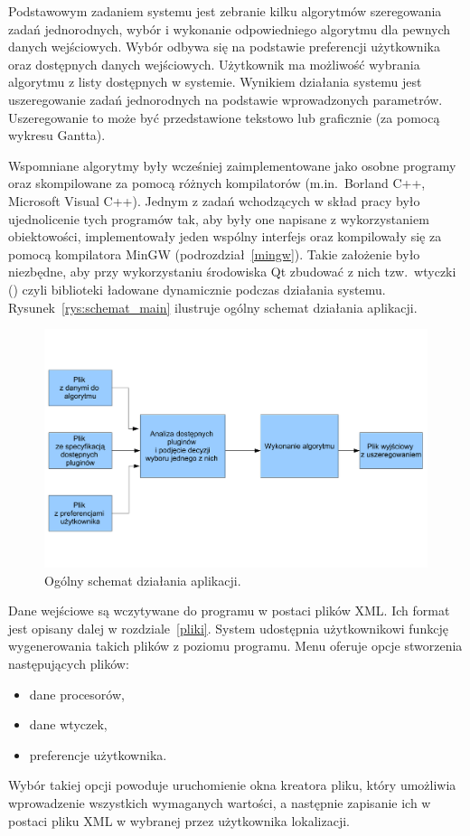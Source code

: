 Podstawowym zadaniem systemu jest zebranie kilku algorytmów szeregowania zadań jednorodnych, wybór i wykonanie odpowiedniego algorytmu 
dla pewnych danych wejściowych. Wybór odbywa się na podstawie preferencji użytkownika oraz dostępnych danych wejściowych. Użytkownik ma 
możliwość wybrania algorytmu z listy dostępnych w systemie. Wynikiem działania systemu jest uszeregowanie zadań jednorodnych na podstawie 
wprowadzonych parametrów. Uszeregowanie to może być przedstawione tekstowo lub graficznie (za pomocą wykresu Gantta).

Wspomniane algorytmy były wcześniej zaimplementowane jako osobne programy oraz skompilowane za pomocą różnych kompilatorów (m.in.~Borland C++, 
Microsoft Visual C++). Jednym z zadań wchodzących w skład pracy było ujednolicenie tych programów tak, aby były one napisane z wykorzystaniem 
obiektowości, implementowały jeden wspólny interfejs oraz kompilowały się za pomocą kompilatora MinGW (podrozdział~\vref{mingw}). Takie 
założenie było niezbędne, aby przy wykorzystaniu środowiska Qt zbudować z nich tzw.~wtyczki () czyli biblioteki ładowane dynamicznie podczas działania 
systemu. Rysunek~\vref{rys:schemat_main} ilustruje ogólny schemat działania aplikacji.

\begin{figure}[t]
\begin{center}
\includegraphics[scale=0.5]{figures/schemat_main.pdf}
\end{center}
\caption{Ogólny schemat działania aplikacji.}\label{rys:schemat_main}
\end{figure}

Dane wejściowe są wczytywane do programu w postaci plików XML. Ich format jest opisany dalej w rozdziale~\vref{pliki}. System udostępnia użytkownikowi 
funkcję wygenerowania takich plików z poziomu programu. Menu oferuje opcje stworzenia następujących plików:
\begin{itemize}
	\item dane procesorów,
	\item dane wtyczek,
	\item preferencje użytkownika.
\end{itemize}
Wybór takiej opcji powoduje uruchomienie okna kreatora pliku, który umożliwia wprowadzenie wszystkich wymaganych wartości, a następnie zapisanie ich 
w postaci pliku XML w wybranej przez użytkownika lokalizacji.

